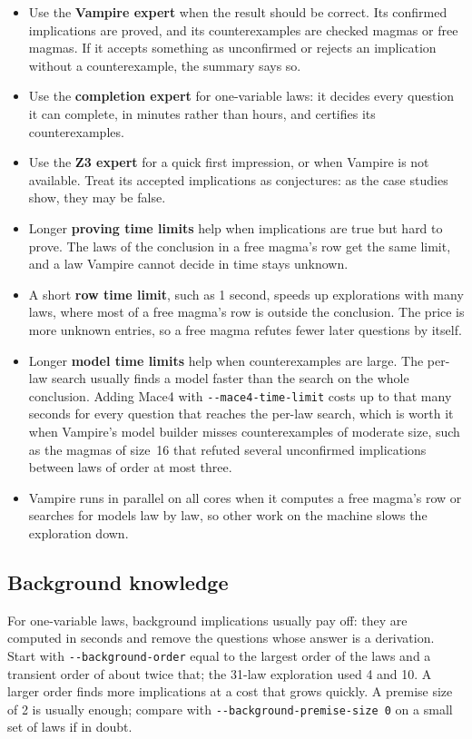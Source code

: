 \documentclass[11pt,a4paper]{article}
\theoremstyle{definition}
\theoremstyle{remark}
\newcommand{\code}[1]{\texttt{#1}}
\begin{document}
\begin{itemize}
  \item Use the \textbf{Vampire expert} when the result should be correct. Its confirmed implications are proved, and its counterexamples are checked magmas or free magmas. If it accepts something as unconfirmed or rejects an implication without a counterexample, the summary says so.
  \item Use the \textbf{completion expert} for one-variable laws: it decides every question it can complete, in minutes rather than hours, and certifies its counterexamples.
  \item Use the \textbf{Z3 expert} for a quick first impression, or when Vampire is not available. Treat its accepted implications as conjectures: as the case studies show, they may be false.
  \item Longer \textbf{proving time limits} help when implications are true but hard to prove. The laws of the conclusion in a free magma's row get the same limit, and a law Vampire cannot decide in time stays unknown.
  \item A short \textbf{row time limit}, such as 1 second, speeds up explorations with many laws, where most of a free magma's row is outside the conclusion. The price is more unknown entries, so a free magma refutes fewer later questions by itself.
  \item Longer \textbf{model time limits} help when counterexamples are large. The per-law search usually finds a model faster than the search on the whole conclusion. Adding Mace4 with \code{-{}-mace4-time-limit} costs up to that many seconds for every question that reaches the per-law search, which is worth it when Vampire's model builder misses counterexamples of moderate size, such as the magmas of size~16 that refuted several unconfirmed implications between laws of order at most three.
  \item Vampire runs in parallel on all cores when it computes a free magma's row or searches for models law by law, so other work on the machine slows the exploration down.
\end{itemize}

\subsection{Background knowledge}

For one-variable laws, background implications usually pay off: they are computed in seconds and remove the questions whose answer is a derivation. Start with \code{-{}-background-order} equal to the largest order of the laws and a transient order of about twice that; the 31-law exploration used 4 and 10. A larger order finds more implications at a cost that grows quickly. A premise size of 2 is usually enough; compare with \code{-{}-background-premise-size 0} on a small set of laws if in doubt.
\end{document}
